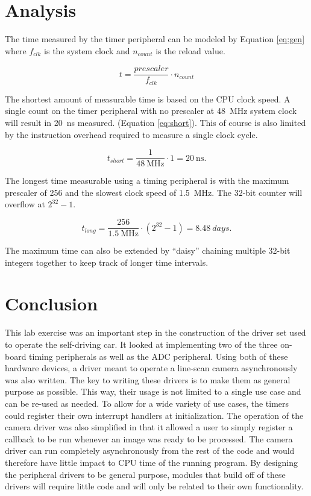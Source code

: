 \documentclass[CMPE]{../KGCOEReport}
\begin{document}
	\section*{Analysis}

	The time measured by the timer peripheral can be modeled by Equation \ref{eq:gen}
	where
	$f_{clk}$ is the system clock and $n_{count}$ is the reload value.
	
	\begin{equation}
	t = \frac{prescaler}{f_{clk}} \cdot n_{count}
	\label{eq:gen}
	\end{equation}

	The shortest amount of measurable time is based on the CPU clock speed. A single
	count on the timer peripheral with no prescaler at \SI{48}{\mega\hertz}
	system clock will result in \SI{20}{\nano\s} measured. (Equation \ref{eq:short}).
	This of course is also limited by the instruction overhead required to measure a
	single clock cycle.

	\begin{equation}
	t_{short} = \frac{1}{\SI{48}{\mega\hertz}} \cdot 1 = \SI{20}{\nano\s}.
	\label{eq:short}
	\end{equation}

	The longest time measurable using
	a timing peripheral is with the maximum prescaler of 256 and the slowest clock speed
	of \SI{1.5}{\mega\hertz}. The 32-bit counter will overflow at $2^{32} - 1$.

	\begin{equation}
	t_{long} = \frac{256}{\SI{1.5}{\mega\hertz}} \cdot (2^{32} - 1) = \SI{8.48}{days}.
	\label{eq:long}
	\end{equation}

	The maximum time can also be extended by ``daisy'' chaining multiple 32-bit integers
	together to keep track of longer time intervals.

    \section*{Conclusion}

	This lab exercise was an important step in the construction of the driver set used
	to operate the self-driving car. It looked at implementing two of the three on-board
	timing peripherals as well as the ADC peripheral. Using both of these hardware devices,
	a driver meant to operate a line-scan camera asynchronously was also written. The key
	to writing these drivers is to make them as general purpose as possible. This way,
	their usage is not limited to a single use case and can be re-used as needed. To allow
	for a wide variety of use cases, the timers could register their own interrupt handlers at
	initialization. The operation of the camera driver was also simplified in that it
	allowed a user to simply register a callback to be run whenever an image was ready to
	be processed. The camera driver can run completely asynchronously from the rest of the
	code and would therefore have little impact to CPU time of the running program. By
	designing the peripheral drivers to be general purpose, modules that build off of these
	drivers will require little code and will only be related to their own functionality.
\end{document}
